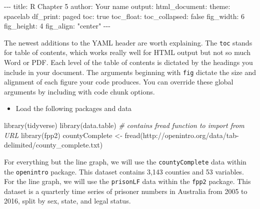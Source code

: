 \documentclass[
]{book}
\makeatletter
\newenvironment{Shaded}{\begin{snugshade}}{\end{snugshade}}
\newcommand{\CommentTok}[1]{\textcolor[rgb]{0.37,0.37,0.37}{\textit{#1}}}
\newcommand{\DecValTok}[1]{\textcolor[rgb]{0.06,0.06,0.06}{#1}}
\newcommand{\FunctionTok}[1]{\textcolor[rgb]{0,0,0}{#1}}
\newcommand{\NormalTok}[1]{#1}
\newcommand{\OtherTok}[1]{\textcolor[rgb]{0.37,0.37,0.37}{#1}}
\newcommand{\SpecialCharTok}[1]{\textcolor[rgb]{0,0,0}{#1}}
\newcommand{\StringTok}[1]{\textcolor[rgb]{0.5,0.5,0.5}{#1}}
\providecommand{\tightlist}{%
  \setlength{\itemsep}{0pt}\setlength{\parskip}{0pt}}
\newenvironment{kframe}{%
\medskip{}
\setlength{\fboxsep}{.8em}
 \def\at@end@of@kframe{}%
 \ifinner\ifhmode%
  \def\at@end@of@kframe{\end{minipage}}%
  \begin{minipage}{\columnwidth}%
 \fi\fi%
 \def\FrameCommand##1{\hskip\@totalleftmargin \hskip-\fboxsep
 \colorbox{shadecolor}{##1}\hskip-\fboxsep
     \hskip-\linewidth \hskip-\@totalleftmargin \hskip\columnwidth}%
 \MakeFramed {\advance\hsize-\width
   \@totalleftmargin\z@ \linewidth\hsize
   \@setminipage}}%
 {\par\unskip\endMakeFramed%
 \at@end@of@kframe}
\renewenvironment{Shaded}{\begin{kframe}}{\end{kframe}}
\makeatother
\begin{document}
\begin{Shaded}
\begin{Highlighting}[]
\SpecialCharTok{{-}{-}{-}}
\NormalTok{title}\SpecialCharTok{:} \StringTok{\textquotesingle{}R Chapter 5\textquotesingle{}}
\NormalTok{author}\SpecialCharTok{:} \StringTok{\textquotesingle{}Your name\textquotesingle{}}
\NormalTok{output}\SpecialCharTok{:} 
\NormalTok{  html\_document}\SpecialCharTok{:}
\NormalTok{    theme}\SpecialCharTok{:}\NormalTok{ spacelab}
\NormalTok{    df\_print}\SpecialCharTok{:}\NormalTok{ paged}
\NormalTok{    toc}\SpecialCharTok{:}\NormalTok{ true}
\NormalTok{    toc\_float}\SpecialCharTok{:}
\NormalTok{      toc\_collapsed}\SpecialCharTok{:}\NormalTok{ false}
\NormalTok{    fig\_width}\SpecialCharTok{:} \DecValTok{6}
\NormalTok{    fig\_height}\SpecialCharTok{:} \DecValTok{4}
\NormalTok{    fig\_align}\SpecialCharTok{:} \StringTok{"center"}
\SpecialCharTok{{-}{-}{-}}
\end{Highlighting}
\end{Shaded}

The newest additions to the YAML header are worth explaining. The \texttt{toc} stands for table of contents, which works really well for HTML output but not so much Word or PDF. Each level of the table of contents is dictated by the headings you include in your document. The arguments beginning with \texttt{fig} dictate the size and alignment of each figure your code produces. You can override these global arguments by including with code chunk options.

\begin{itemize}
\tightlist
\item
  Load the following packages and data
\end{itemize}

\begin{Shaded}
\begin{Highlighting}[]
\FunctionTok{library}\NormalTok{(tidyverse)}
\FunctionTok{library}\NormalTok{(data.table) }\CommentTok{\# contains fread function to import from URL}
\FunctionTok{library}\NormalTok{(fpp2)}
\NormalTok{countyComplete }\OtherTok{\textless{}{-}} \FunctionTok{fread}\NormalTok{(}\StringTok{\textquotesingle{}http://openintro.org/data/tab{-}delimited/county\_complete.txt\textquotesingle{}}\NormalTok{)}
\end{Highlighting}
\end{Shaded}

For everything but the line graph, we will use the \texttt{countyComplete} data within the \texttt{openintro} package. This dataset contains 3,143 counties and 53 variables. For the line graph, we will use the \texttt{prisonLF} data within the \texttt{fpp2} package. This dataset is a quarterly time series of prisoner numbers in Australia from 2005 to 2016, split by sex, state, and legal status.
\end{document}
